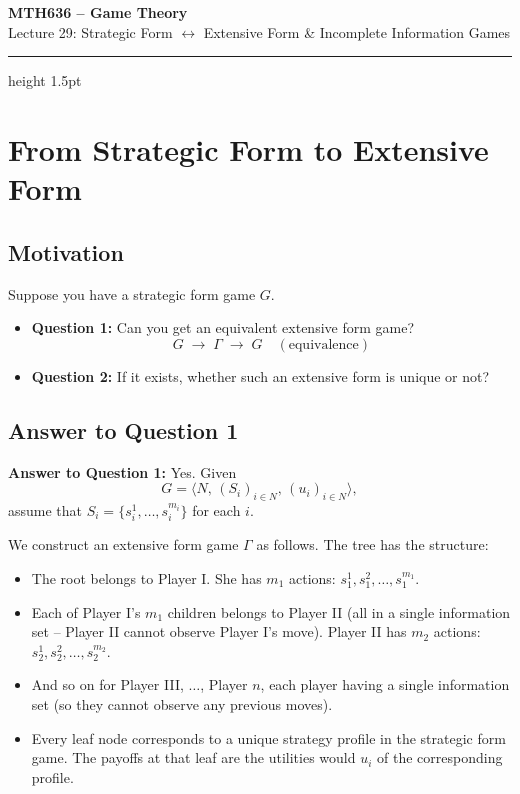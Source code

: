 \documentclass[12pt, a4paper]{article}
\begin{document}
\begin{center}
  {\LARGE\bfseries\sffamily\color{defblue} MTH636 -- Game Theory}\\[6pt]
  {\Large\sffamily Lecture 29: Strategic Form $\leftrightarrow$ Extensive Form \& Incomplete Information Games}\\[4pt]
\end{center}
\vspace{0.5cm}
\hrule height 1.5pt
\vspace{0.3cm}

\section{From Strategic Form to Extensive Form}

\subsection{Motivation}

Suppose you have a strategic form game $G$.

\begin{itemize}
  \item \textbf{Question 1:} Can you get an equivalent extensive form game?
  \[
    G \;\longrightarrow\; \Gamma \;\longrightarrow\; G \quad (\text{equivalence})
  \]
  \item \textbf{Question 2:} If it exists, whether such an extensive form is unique or not?
\end{itemize}

\subsection{Answer to Question 1}

\noindent\textbf{Answer to Question 1:} Yes. Given
\[
  G = \bigl\langle N,\, (S_i)_{i \in N},\, (u_i)_{i \in N} \bigr\rangle,
\]
assume that $S_i = \{s_i^1, \ldots, s_i^{m_i}\}$ for each $i$.

\medskip
We construct an extensive form game $\Gamma$ as follows. The tree has the structure:
\begin{itemize}
  \item The root belongs to Player I. She has $m_1$ actions: $s_1^1, s_1^2, \ldots, s_1^{m_1}$.
  \item Each of Player I's $m_1$ children belongs to Player II (all in a single information set -- Player II cannot observe Player I's move). Player II has $m_2$ actions: $s_2^1, s_2^2, \ldots, s_2^{m_2}$.
  \item And so on for Player III, $\ldots$, Player $n$, each player having a single information set (so they cannot observe any previous moves).
  \item Every leaf node corresponds to a unique strategy profile in the strategic form game. The payoffs at that leaf are the utilities would $u_i$ of the corresponding profile.
\end{itemize}
\end{document}

